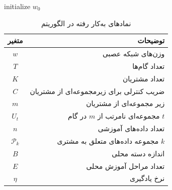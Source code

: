 \begin{LTR}
\begin{algorithm}[t]
	\begin{RTL}
		\caption{%
میانگین‌گیری فدرال
			\cite{mcmahan2017communication}
		}
		\label{algo_FedAvg}
	\end{RTL}
	
	\begin{latin}
		initialize $w_0$\;
	\end{latin}
\end{algorithm}
\end{LTR}


\begin{table}[h]
	\centering
	\caption{نمادهای به‌کار رفته در الگوریتم
	}
	\label{tabel_FedAvgNotations}
	\begin{tabular}{cr}
		\hline
		متغیر & توضیحات \\
		\hline
		$w$ & وزن‌های شبکه عصبی \\
		$T$ & تعداد گام‌ها \\
		$K$ & تعداد مشتریان \\
		$C$ & ضریب کنترلی برای زیرمجموعه‌ای از مشتریان \\
		$m$ & زیر مجموعه‌ای از مشتریان \\
		$U_t$ & مجموعه‌ای نامرتب از $m$ در گام $t$ \\
		$n$ & تعداد داده‌های آموزشی \\
		$\mathcal{P}_k$ & مجموعه داده‌های متعلق به مشتری $k$ \\
		$B$ & اندازه دسته محلی \\
		$E$ & تعداد مراحل آموزش محلی \\
		$\eta$ & نرخ یادگیری \\
		\hline
	\end{tabular}
\end{table}


